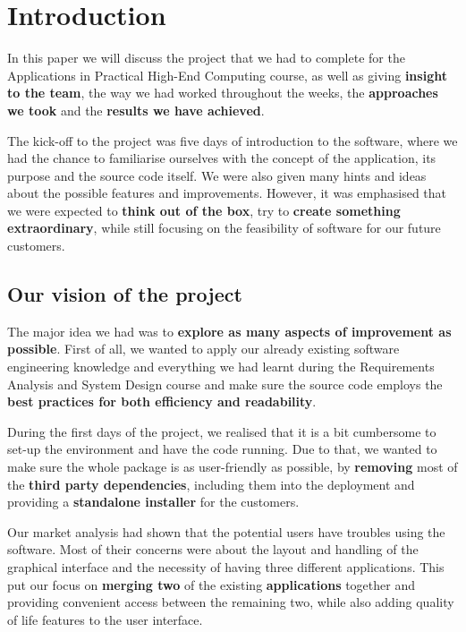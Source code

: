 \documentclass[a4paper, 11pt, article]{report}
\begin{document}

\tableofcontents
\newpage

\listoffigures
\newpage

\chapter{Introduction}

In this paper we will discuss the project that we had to complete for the Applications in Practical High-End Computing course, as well as giving \textbf{insight to the team}, the way we had worked throughout the weeks, the \textbf{approaches we took} and the \textbf{results we have achieved}.

The kick-off to the project was five days of introduction to the software, where we had the chance to familiarise ourselves with the concept of the application, its purpose and the source code itself. We were also given many hints and ideas about the possible features and improvements. However, it was emphasised that we were expected to \textbf{think out of the box}, try to \textbf{create something extraordinary}, while still focusing on the feasibility of software for our future customers.

\section{Our vision of the project}

The major idea we had was to \textbf{explore as many aspects of improvement as possible}. First of all, we wanted to apply our already existing software engineering knowledge and everything we had learnt during the Requirements Analysis and System Design course and make sure the source code employs the \textbf{best practices for both efficiency and readability}.

During the first days of the project, we realised that it is a bit cumbersome to set-up the environment and have the code running. Due to that, we wanted to make sure the whole package is as user-friendly as possible, by \textbf{removing} most of the \textbf{third party dependencies}, including them into the deployment and providing a \textbf{standalone installer} for the customers.

Our market analysis had shown that the potential users have troubles using the software. Most of their concerns were about the layout and handling of the graphical interface and the necessity of having three different applications. This put our focus on \textbf{merging two} of the existing \textbf{applications} together and providing convenient access between the remaining two, while also adding quality of life features to the user interface.
\end{document}

